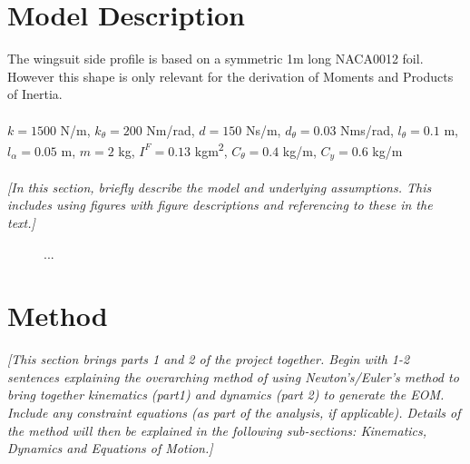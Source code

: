 \documentclass[11pt]{article}
\begin{document}
\section*{Model Description}
The wingsuit side profile is based on a symmetric 1m long NACA0012 foil.
However this shape is only relevant for the derivation of Moments and Products of Inertia.\\\\
$k = 1500$ N/m, $k_{\theta} = 200$ Nm/rad, $d = 150$ Ns/m, $d_{\theta} = 0.03$ Nms/rad, $l_{\theta} = 0.1$ m, $l_{\alpha} = 0.05$ m, $m = 2$ kg, $I^F = 0.13$ kgm\textsuperscript{2}, $C_{\theta} = 0.4$ kg/m, $C_y = 0.6$ kg/m
\\\\
\textcolor[rgb]{0.80,0.29,0.09}{\textsl{[In this section, briefly describe the model and underlying assumptions. This includes using figures with figure descriptions and referencing to these in the text.]}}

\begin{figure}[h!]
  \centering
  \caption{...}\label{fig:model}
\end{figure}

\section*{Method}\label{sec:method}
\textcolor[rgb]{0.80,0.29,0.09}{\textsl{[This section brings parts 1 and 2 of the project together. Begin with 1-2 sentences explaining the overarching method of using Newton’s/Euler’s method to bring together kinematics (part1) and dynamics (part 2) to generate the EOM.  Include any constraint equations (as part of the analysis, if applicable). Details of the method will then be explained in the following sub-sections: Kinematics, Dynamics and Equations of Motion.]}}


\end{document}
